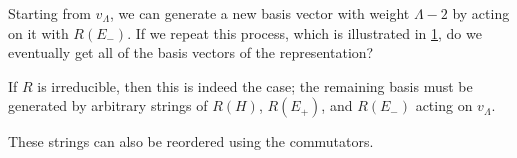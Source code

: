 \begin{figure}[tbhp]
  \centering
  \def\svgwidth{0.3\columnwidth}
  
  \caption{}
  \label{fig:l11f1}
\end{figure}

Starting from $v_{\Lambda}$, we can generate a new basis vector with weight $\Lambda -2$ by acting on it with $R(E_-)$. If we repeat this process, which is illustrated in \ref{fig:l11f1}, do we eventually get all of the basis vectors of the representation?
\begin{claim}
If $R$ is irreducible, then this is indeed the case; the remaining basis must be generated by arbitrary strings of $R(H)$, $R(E_+)$, and $R(E_-)$ acting on $v_\Lambda$.
\end{claim}
\begin{leftbar}
  \begin{remark}
    These strings can also be reordered using the commutators.
  \end{remark}
\end{leftbar}
